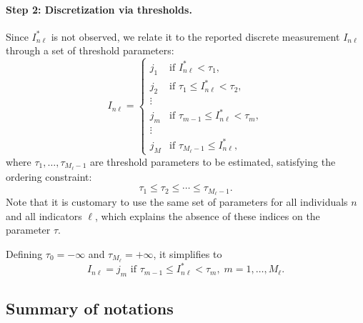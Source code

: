 \documentclass[12pt,a4paper]{article}
\begin{document}
\paragraph{Step 2: Discretization via thresholds.} Since $I^*_{n\ell}$ is not observed, we relate it to the reported discrete measurement $I_{n\ell}$ through a set of threshold parameters:
\begin{equation}
\label{eq:discreteMeas-b}
I_{n\ell} = \left\{
\begin{array}{ll}
j_1 & \text{if } I^*_{n\ell} < \tau_1, \\
j_2 & \text{if } \tau_1 \leq I^*_{n\ell} < \tau_2, \\
\vdots \\
j_m & \text{if } \tau_{m-1} \leq I^*_{n\ell} < \tau_m, \\
\vdots \\
j_M & \text{if } \tau_{M_\ell-1} \leq I^*_{n\ell},
\end{array}
\right.
\end{equation}
where $\tau_1, \ldots, \tau_{M_\ell-1}$ are threshold parameters to be estimated, satisfying the ordering constraint:
\begin{equation}
\label{eq:discreteMeas-c}
\tau_1 \leq \tau_2 \leq \cdots \leq \tau_{M_\ell-1}.
\end{equation}
Note that it is customary to use the same set of parameters for all
individuals $n$ and all indicators $\ell$, which explains the absence
of these indices on the parameter $\tau$.

Defining $\tau_0=-\infty$ and $\tau_{M_\ell}=+\infty$, it simplifies to
\begin{equation}
I_{n\ell} = j_m  \text{ if } \tau_{m-1} \leq I^*_{n\ell} < \tau_m, \; m=1, \ldots, M_\ell. 
\end{equation}






\subsection{Summary of notations}
\end{document}
